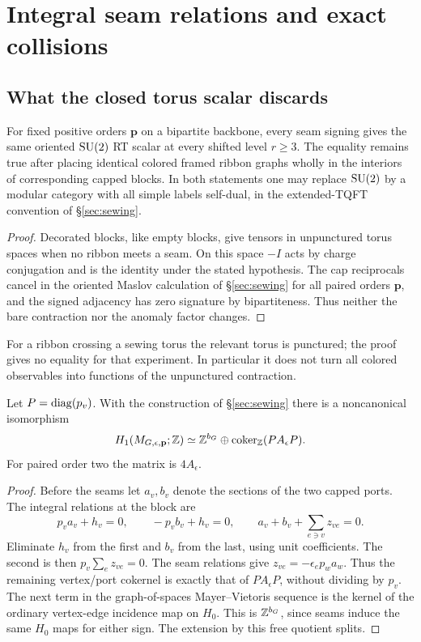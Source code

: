 \section{Integral seam relations and exact collisions}\label{sec:collision}

\subsection{What the closed torus scalar discards}

\begin{proposition}\label{prop:blind}
For fixed positive orders \(\mathbf p\) on a bipartite backbone,
every seam signing gives the same oriented \(\mathrm{SU}(2)\) RT scalar
at every shifted level \(r\ge3\). The equality remains true after
placing identical colored framed ribbon graphs wholly in the
interiors of corresponding capped blocks. In both statements
one may replace \(\mathrm{SU}(2)\) by a modular category with all simple
labels self-dual, in the extended-TQFT convention of
\S\ref{sec:sewing}.
\end{proposition}
\begin{proof}
Decorated blocks, like empty blocks, give tensors in unpunctured
torus spaces when no ribbon meets a seam. On this space \(-I\)
acts by charge conjugation and is the identity under the stated
hypothesis. The cap reciprocals cancel in the oriented Maslov
calculation of \S\ref{sec:sewing} for all paired orders \(\mathbf p\),
and the signed adjacency has zero signature by bipartiteness.
Thus neither the bare contraction nor the anomaly factor changes.
\end{proof}

For a ribbon crossing a sewing torus the relevant torus is punctured;
the proof gives no equality for that experiment. In particular it
does not turn all colored observables into functions of the
unpunctured contraction.

\begin{theorem}\label{thm:integral}
Let \(P=\operatorname{diag}(p_v)\). With the construction of \S\ref{sec:sewing}
there is a noncanonical isomorphism
\[
 H_1(M_{G,\epsilon,\mathbf p};\mathbb Z)
  \simeq \mathbb Z^{b_G}\oplus\operatorname{coker}_{\mathbb Z}(P A_\epsilon P).
\]
For paired order two the matrix is \(4A_\epsilon\).
\end{theorem}
\begin{proof}
Before the seams let \(a_v,b_v\) denote the sections of the
two capped ports. The integral relations at the block are
\[
 p_va_v+h_v=0,\qquad -p_vb_v+h_v=0,\qquad
 a_v+b_v+\sum_{e\ni v}z_{ve}=0.
\]
Eliminate \(h_v\) from the first and \(b_v\) from the last, using
unit coefficients. The second is then \(p_v\sum_e z_{ve}=0\).
The seam relations give \(z_{ve}=-\epsilon_e p_w a_w\).
Thus the remaining vertex/port cokernel is exactly that of
\(P A_\epsilon P\), without dividing by \(p_v\).
The next term in the graph-of-spaces Mayer--Vietoris sequence
is the kernel of the ordinary vertex-edge incidence map on
\(H_0\). This is \(\mathbb Z^{b_G}\), since seams induce the same
\(H_0\) maps for either sign. The extension by this free quotient
splits.
\end{proof}

